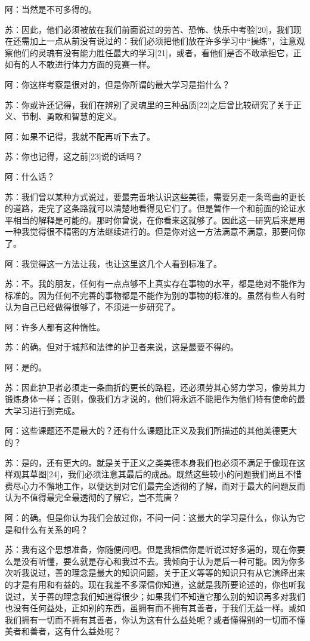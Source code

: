 \documentclass[12pt,oneside]{book}
\begin{document}
阿：当然是不可多得的。

苏：因此，他们必须被放在我们前面说过的劳苦、恐怖、快乐中考验[20]，我们现在还需加上一点从前没有说过的：我们必须把他们放在许多学习中“操练”，注意观察他们的灵魂有没有能力胜任最大的学习[21]，或者，看他们是否不敢承担它，正如有的人不敢进行体力方面的竞赛一样。

阿：你这样考察是很对的，但是你所谓的最大学习是指什么？

苏：你或许还记得，我们在辨别了灵魂里的三种品质[22]之后曾比较研究了关于正义、节制、勇敢和智慧的定义。

阿：如果不记得，我就不配再听下去了。

苏：你也记得，这之前[23]说的话吗？

阿：什么话？

苏：我们曾以某种方式说过，要最完善地认识这些美德，需要另走一条弯曲的更长的道路，走完了这条路就可以清楚地看得见它们了。但是暂作一个和前面的论证水平相当的解释是可能的。那时你曾说，在你看来这就够了。因此这一研究后来是用一种我觉得很不精密的方法继续进行的。但是你对这一方法满意不满意，那要问你了。

阿：我觉得这一方法让我，也让这里这几个人看到标准了。

苏：不。我的朋友，任何有一点点够不上真实存在事物的水平，都是绝对不能作为标准的。因为任何不完善的事物都是不能作为别的事物的标准的。虽然有些人有时认为自己已经做得很够了，不须进一步研究了。

阿：许多人都有这种惰性。

苏：的确。但对于城邦和法律的护卫者来说，这是最要不得的。

阿：是的。

苏：因此护卫者必须走一条曲折的更长的路程，还必须劳其心努力学习，像劳其力锻炼身体一样；否则，像我们方才说的，他们将永远不能把作为他们特有使命的最大学习进行到完成。

阿：这些课题还不是最大的？还有什么课题比正义及我们所描述的其他美德更大的？

苏：是的，还有更大的。就是关于正义之类美德本身我们也必须不满足于像现在这样观其草图[24]，我们必须注意其最后的成品。既然这些较小的问题我们尚且不惜费尽心力不懈地工作，以便达到对它们最完全透彻的了解，而对于最大的问题反而认为不值得最完全最透彻的了解它，岂不荒唐？

阿：的确。但是你认为我们会放过你，不问一问：这最大的学习是什么，你认为它是和什么有关系的吗？

苏：我有这个思想准备，你随便问吧。但是我相信你是听说过好多遍的，现在你要么是没有听懂，要么就是存心和我过不去。我倾向于认为是后一种可能。因为你多次听我说过，善的理念是最大的知识问题，关于正义等等的知识只有从它演绎出来的才是有用和有益的。现在我差不多深信你知道，这就是我所要论述的，你也听我说过，关于善的理念我们知道得很少；如果我们不知道它那么别的知识再多对我们也没有任何益处，正如别的东西，虽拥有而不拥有其善者，于我们无益一样。或如我们拥有一切而不拥有其善者，你认为这有什么益处呢？或者懂得别的一切而不懂美者和善者，这有什么益处呢？
\end{document}
